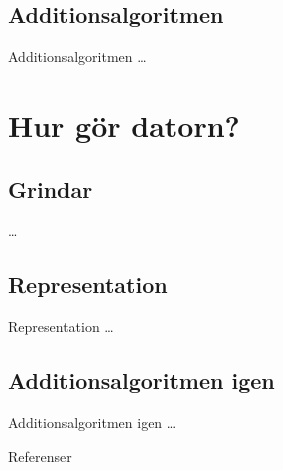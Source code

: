 \documentclass{beamer}
\begin{document}
\subsection{Additionsalgoritmen}
\begin{frame}{Additionsalgoritmen}
	\dots
\end{frame}


\section{Hur gör datorn?}

\subsection{Grindar}
\begin{frame}
	\dots
\end{frame}

\subsection{Representation}
\begin{frame}{Representation}
	\dots
\end{frame}

\subsection{Additionsalgoritmen igen}
\begin{frame}{Additionsalgoritmen igen}
	\dots
\end{frame}



\begin{frame}{Referenser}
	
\end{frame}
\end{document}
